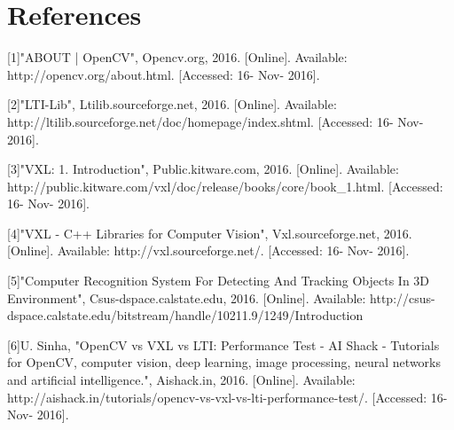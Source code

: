 \documentclass[letterpaper,10pt,onecolumn,draftclsnofoot]{IEEEtran}
\begin{document}
\section{References}

[1]"ABOUT | OpenCV", Opencv.org, 2016. [Online]. Available: http://opencv.org/about.html. [Accessed: 16- Nov- 2016].

[2]"LTI-Lib", Ltilib.sourceforge.net, 2016. [Online]. Available: http://ltilib.sourceforge.net/doc/homepage/index.shtml. [Accessed: 16- Nov- 2016].

[3]"VXL: 1. Introduction", Public.kitware.com, 2016. [Online]. Available: http://public.kitware.com/vxl/doc/release/books/core/book\_1.html. [Accessed: 16- Nov- 2016].

[4]"VXL - C++ Libraries for Computer Vision", Vxl.sourceforge.net, 2016. [Online]. Available: http://vxl.sourceforge.net/. [Accessed: 16- Nov- 2016].

[5]"Computer Recognition System For Detecting And Tracking Objects In 3D Environment", Csus-dspace.calstate.edu, 2016. [Online]. Available: http://csus-dspace.calstate.edu/bitstream/handle/10211.9/1249/Introduction%

[6]U. Sinha, "OpenCV vs VXL vs LTI: Performance Test - AI Shack - Tutorials for OpenCV, computer vision, deep learning, image processing, neural networks and artificial intelligence.", Aishack.in, 2016. [Online]. Available: http://aishack.in/tutorials/opencv-vs-vxl-vs-lti-performance-test/. [Accessed: 16- Nov- 2016].




\end{document}
